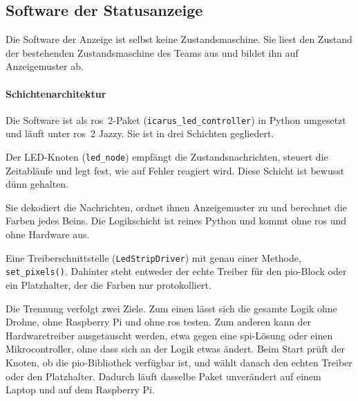         \subsection{Software der Statusanzeige}
        \label{sec:LED_Software}

        Die Software der Anzeige ist selbst keine Zustandsmaschine. Sie liest den Zustand der bestehenden Zustandsmaschine des Teams aus und bildet ihn auf Anzeigemuster ab.

            \paragraph{Schichtenarchitektur}
            Die Software ist als \gls{ros}~2-Paket (\texttt{icarus\_led\_controller}) in Python umgesetzt und läuft unter \gls{ros}~2 Jazzy. Sie ist in drei Schichten gegliedert. %

            \begin{description}[style=nextline]
                \item[ROS-Schicht] Der LED-Knoten (\texttt{led\_node}) empfängt die Zustandsnachrichten, steuert die Zeitabläufe und legt fest, wie auf Fehler reagiert wird. Diese Schicht ist bewusst dünn gehalten.
                \item[Logikschicht] Sie dekodiert die Nachrichten, ordnet ihnen Anzeigemuster zu und berechnet die Farben jedes Beins. Die Logikschicht ist reines Python und kommt ohne \gls{ros} und ohne Hardware aus.
                \item[Hardwareschicht] Eine Treiberschnittstelle (\texttt{LedStripDriver}) mit genau einer Methode, \texttt{set\_pixels()}. Dahinter steht entweder der echte Treiber für den \gls{pio}-Block oder ein Platzhalter, der die Farben nur protokolliert.
            \end{description}

            Die Trennung verfolgt zwei Ziele. Zum einen lässt sich die gesamte Logik ohne Drohne, ohne Raspberry Pi und ohne \gls{ros} testen. Zum anderen kann der Hardwaretreiber ausgetauscht werden, etwa gegen eine \gls{spi}-Lösung oder einen Mikrocontroller, ohne dass sich an der Logik etwas ändert. Beim Start prüft der Knoten, ob die \gls{pio}-Bibliothek verfügbar ist, und wählt danach den echten Treiber oder den Platzhalter. Dadurch läuft dasselbe Paket unverändert auf einem Laptop und auf dem Raspberry Pi.

